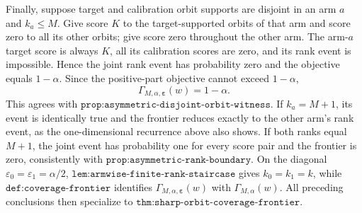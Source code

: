 Finally, suppose target and calibration orbit supports are disjoint in an arm \(a\) and \(k_a\le M\). Give score \(K\) to the target-supported orbits of that arm and score zero to all its other orbits; give score zero throughout the other arm. The arm-\(a\) target score is always \(K\), all its calibration scores are zero, and its rank event is impossible. Hence the joint rank event has probability zero and the objective equals \(1-\alpha\). Since the positive-part objective cannot exceed \(1-\alpha\),
\[
\Gamma_{M,\alpha,\boldsymbol\varepsilon}(w)=1-\alpha.
\]
This agrees with \(\texttt{prop:asymmetric-disjoint-orbit-witness}\). If \(k_a=M+1\), its event is identically true and the frontier reduces exactly to the other arm's rank event, as the one-dimensional recurrence above also shows. If both ranks equal \(M+1\), the joint event has probability one for every score pair and the frontier is zero, consistently with \(\texttt{prop:asymmetric-rank-boundary}\). On the diagonal \(\varepsilon_0=\varepsilon_1=\alpha/2\), \(\texttt{lem:armwise-finite-rank-staircase}\) gives \(k_0=k_1=k\), while \(\texttt{def:coverage-frontier}\) identifies \(\Gamma_{M,\alpha,\boldsymbol\varepsilon}(w)\) with \(\Gamma_{M,\alpha}(w)\). All preceding conclusions then specialize to \(\texttt{thm:sharp-orbit-coverage-frontier}\).